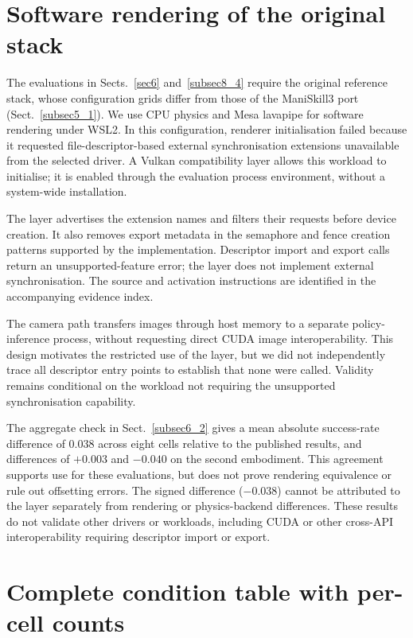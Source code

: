 \documentclass[pdflatex,iicol,sn-apa]{sn-jnl}
\theoremstyle{remark}
\begin{document}
\begin{appendices}
\section{Software rendering of the original stack}\label{secB}

The evaluations in Sects.~\ref{sec6} and~\ref{subsec8_4} require the original reference stack,
whose configuration grids differ from those of the ManiSkill3 port (Sect.~\ref{subsec5_1}).
We use CPU physics and Mesa lavapipe for software rendering under WSL2. In this configuration,
renderer initialisation failed because it requested file-descriptor-based external synchronisation
extensions unavailable from the selected driver. A Vulkan compatibility layer allows this
workload to initialise; it is enabled through the evaluation process environment, without a
system-wide installation.

The layer advertises the extension names and filters their requests before device creation.
It also removes export metadata in the semaphore and fence creation patterns supported by the
implementation. Descriptor import and export calls return an unsupported-feature error;
the layer does not implement external synchronisation. The source and activation instructions
are identified in the accompanying evidence index.

The camera path transfers images through host memory to a separate policy-inference process,
without requesting direct CUDA image interoperability. This design motivates the restricted use
of the layer, but we did not independently trace all descriptor entry points to establish that
none were called. Validity remains conditional on the workload not requiring the unsupported
synchronisation capability.

The aggregate check in Sect.~\ref{subsec6_2} gives a mean absolute success-rate difference of
0.038 across eight cells relative to the published results, and differences of $+0.003$ and
$-0.040$ on the second embodiment. This agreement supports use for these evaluations, but
does not prove rendering equivalence or rule out offsetting errors. The signed difference
($-0.038$) cannot be attributed to the layer separately from rendering or physics-backend
differences. These results do not validate other drivers or workloads, including CUDA or other
cross-API interoperability requiring descriptor import or export.

\section{Complete condition table with per-cell counts}\label{secC}


\end{appendices}
\end{document}
